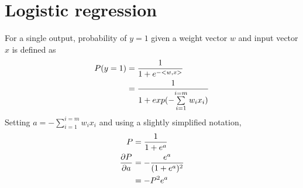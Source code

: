 \section{Logistic regression} 
For a single output,  probability of $y=1$  given a weight vector $w$ and input vector $x$  is defined as 
\begin{equation}
	\begin{aligned}
		P(y=1)&=\frac{1}{1+e^{-<w,x>}} 	\\
		 & = \frac{1}{1+exp(-{\sum\limits_{i=1}^{i=m} w_ix_i})}
	\end{aligned} \\
\end{equation}
Setting $a=-{\sum\limits_{i=1}^{i=m} w_ix_i}$ and using a slightly simplified notation, 
\begin{equation}
\begin{aligned}
P&=\frac{1}{1+e^a}  \\
\frac{\partial P}{\partial a} &= -\frac{e^a}{(1+e^a)^2}  \\
 &=-P^2e^a \\
\end{aligned} \\
\end{equation}


